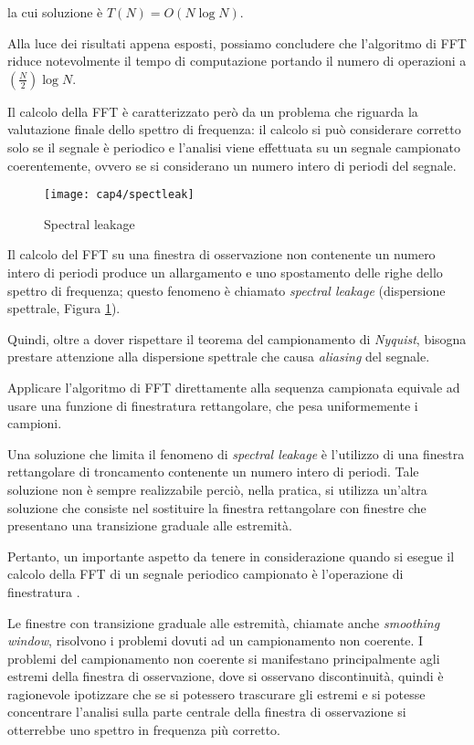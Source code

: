 la cui soluzione è $T(N)=O(N \log N )$.

Alla luce dei risultati appena esposti, possiamo concludere che l'algoritmo di FFT riduce notevolmente il tempo di computazione portando il numero di operazioni a $(\frac{N}{2}) \log N$.

Il calcolo della FFT è caratterizzato però da un problema che riguarda la valutazione finale dello spettro di frequenza: il calcolo si può considerare corretto solo se il segnale è periodico e l'analisi viene effettuata su un segnale campionato coerentemente, ovvero se si considerano un numero intero di periodi del segnale.

\begin{figure}[H]  
  \begin{center}
    \texttt{[image: cap4/spectleak]}
    \caption{Spectral leakage}
    \label{spectleak}
  \end{center}
\end{figure}

Il calcolo del FFT su una finestra di osservazione non contenente un numero intero di periodi produce un allargamento e uno spostamento delle righe dello spettro di frequenza; questo fenomeno è chiamato \textit{spectral leakage} (dispersione spettrale, Figura \ref{spectleak}). 

Quindi, oltre a dover rispettare il teorema del campionamento di \textit{Nyquist}, bisogna prestare attenzione alla dispersione spettrale che causa \textit{aliasing} del segnale.

Applicare l'algoritmo di FFT direttamente alla sequenza campionata equivale ad usare una funzione di finestratura rettangolare, che pesa uniformemente i campioni.

Una soluzione che limita il fenomeno di \textit{spectral leakage} è l'utilizzo di una finestra rettangolare di troncamento contenente un numero intero di periodi. Tale soluzione non è sempre realizzabile perciò, nella pratica, si utilizza un'altra soluzione che consiste nel sostituire la finestra rettangolare con finestre che presentano una transizione graduale alle estremità. 

Pertanto, un importante aspetto da tenere in considerazione quando si esegue il calcolo della FFT di un segnale periodico campionato è l'operazione di finestratura \cite{31004}. 

Le finestre con transizione graduale alle estremità, chiamate anche \textit{smoothing window}, risolvono i problemi dovuti ad un campionamento non coerente. I problemi del campionamento non coerente si manifestano principalmente agli estremi della finestra di osservazione, dove si osservano discontinuità, quindi è ragionevole ipotizzare che se si potessero trascurare gli estremi e si potesse concentrare l'analisi sulla parte centrale della finestra di osservazione si otterrebbe uno spettro in frequenza più corretto. 

